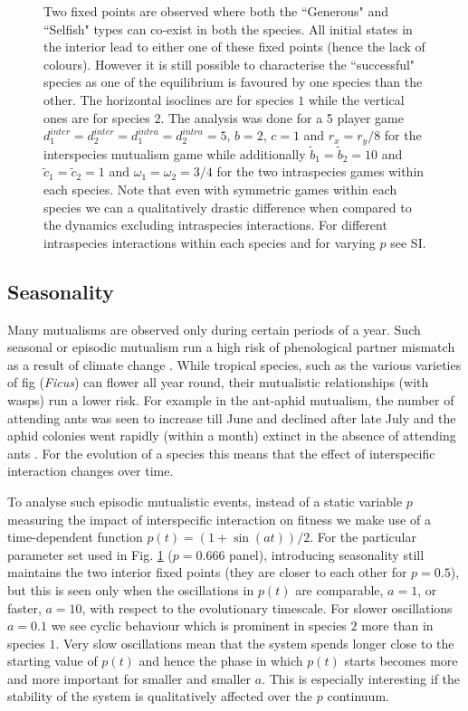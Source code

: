 \documentclass[12pt]{article}
\begin{document}
\begin{figure}
\begin{center}
{{Two fixed points are observed where both the ``Generous" and ``Selfish" types can co-exist in both the species.
All initial states in the interior lead to either one of these fixed points (hence the lack of colours).
However it is still possible to characterise the ``successful" species as one of the equilibrium is favoured by one species than the other.
The horizontal isoclines are for species $1$ while the vertical ones are for species $2$.
The analysis was done for a 5 player game $d_1^{inter} = d_2^{inter} = d_1^{intra} = d_2^{intra} = 5$, $b=2$, $c=1$ and $r_x = r_y /8$ for the interspecies mutualism game while additionally $\tilde{b}_1 = \tilde{b}_2 = 10$ and $\tilde{c}_1 = \tilde{c}_2 = 1$ and $\omega_1 = \omega_2 = 3/4$ for the two intraspecies games within each species. Note that even with symmetric games within each species we can a qualitatively drastic difference when compared to the dynamics excluding intraspecies interactions.  For different intraspecies interactions within each species and for varying $p$ see SI.}
\label{fig:mainexampleone}
}
\end{center}
\end{figure}

\subsection{Seasonality}

Many mutualisms are observed only during certain periods of a year.
Such seasonal or episodic mutualism run a high risk of phenological partner mismatch as a result of climate change \citep{rafferty:Oikos:2015}.
While tropical species, such as the various varieties of fig (\textit{Ficus}) can flower all year round, their mutualistic relationships (with wasps) run a lower risk.
For example in the ant-aphid mutualism, the number of attending ants was seen to increase till June and declined after late July and the aphid colonies went rapidly (within a month) extinct in the absence of attending ants \citep{yao:Oikos:2000,yao:JIS:2009}.
For the evolution of a species this means that the effect of interspecific interaction changes over time.

To analyse such episodic mutualistic events, instead of a static variable $p$ measuring the impact of interspecific interaction on fitness we make use of a time-dependent function $p(t) = (1 + \sin(a t))/2 $.
For the particular parameter set used in Fig. \ref{fig:mainexampleone} ($p=0.666$ panel), introducing seasonality still maintains the two interior fixed points (they are closer to each other for $p = 0.5$), but this is seen only when the oscillations in $p(t)$  are comparable, $a=1$, or faster, $a=10$, with respect to the evolutionary timescale.
For slower oscillations $a=0.1$ we see cyclic behaviour which is prominent in species $2$ more than in species $1$.
Very slow oscillations mean that the system spends longer close to the starting value of $p(t)$ and hence the phase in which $p(t)$ starts becomes more and more important for smaller and smaller $a$. 
This is especially interesting if the stability of the system is qualitatively affected over the $p$ continuum.
\end{document}

